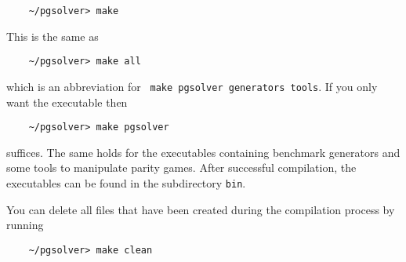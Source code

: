 





\begin{verbatim}
    ~/pgsolver> make
\end{verbatim}
This is the same as
\begin{verbatim}
    ~/pgsolver> make all
\end{verbatim}
which is an abbreviation for \verb# make pgsolver generators tools#. If you only want the executable \pgsolver then 
\begin{verbatim}
    ~/pgsolver> make pgsolver
\end{verbatim}
suffices. The same holds for the executables containing benchmark generators and some tools to manipulate parity games.
After successful compilation, the executables can be found in the
subdirectory \texttt{bin}.

You can delete all files that have been created during the compilation process by running
\begin{verbatim}
    ~/pgsolver> make clean
\end{verbatim}

